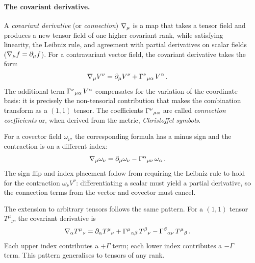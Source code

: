 \paragraph{The covariant derivative.}

A \emph{covariant derivative} (or \emph{connection}) $\nabla_{\mu}$ is a map
that takes a tensor field and produces a new tensor field of one higher
covariant rank, while satisfying linearity, the Leibniz rule, and agreement
with partial derivatives on scalar fields ($\nabla_{\mu} f = \partial_{\mu} f$).  For a
contravariant vector field, the covariant derivative takes the form
%
\begin{equation}
  \nabla_{\mu} V^\nu = \partial_{\mu} V^\nu
    + \Gamma^{\nu}{}_{\mu \alpha}\, V^\alpha \,.
  \label{eq:covariant-deriv-vector}
\end{equation}
%
The additional term $\Gamma^{\nu}{}_{\mu \alpha}\, V^\alpha$ compensates for
the variation of the coordinate basis: it is precisely the non-tensorial
contribution that makes the combination transform as a $(1,1)$ tensor.  The
coefficients $\Gamma^{\nu}{}_{\mu \alpha}$ are called \emph{connection
coefficients} or, when derived from the metric, \emph{Christoffel symbols}.

For a covector field $\omega_\nu$, the corresponding formula has a minus sign
and the contraction is on a different index:
%
\begin{equation}
  \nabla_{\mu} \omega_\nu = \partial_{\mu} \omega_\nu
    - \Gamma^{\alpha}{}_{\mu \nu}\, \omega_\alpha \,.
  \label{eq:covariant-deriv-covector}
\end{equation}
%
The sign flip and index placement follow from requiring the Leibniz rule to hold
for the contraction $\omega_\nu V^\nu$: differentiating a scalar must yield a
partial derivative, so the connection terms from the vector and covector must
cancel.

The extension to arbitrary tensors follows the same pattern.  For a $(1,1)$
tensor $T^\mu{}_\nu$, the covariant derivative is
%
\begin{equation}
  \nabla_{\alpha} T^\mu{}_\nu = \partial_{\alpha} T^\mu{}_\nu
    + \Gamma^{\mu}{}_{\alpha \beta}\, T^\beta{}_\nu
    - \Gamma^{\beta}{}_{\alpha \nu}\, T^\mu{}_\beta \,.
  \label{eq:covariant-deriv-mixed}
\end{equation}
%
Each upper index contributes a $+\Gamma$ term; each lower index contributes a
$-\Gamma$ term.  This pattern generalises to tensors of any rank.

